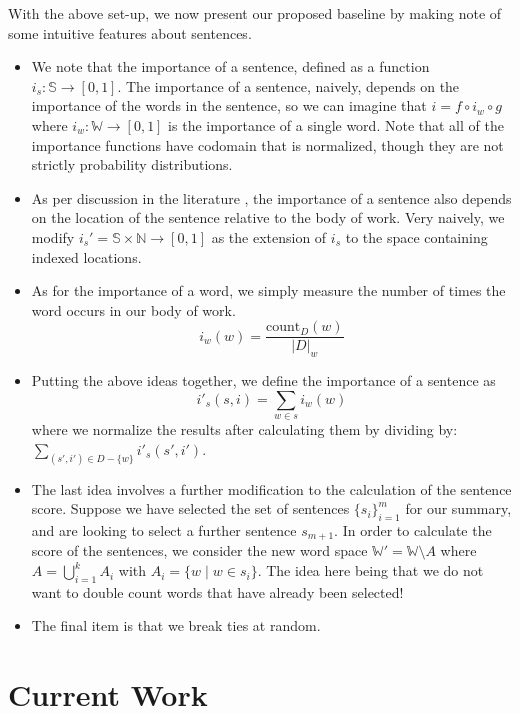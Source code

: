 \documentclass[10pt]{article}
\begin{document}
With the above set-up, we now present our proposed baseline by making note of some intuitive features about sentences.
\begin{itemize}
\item We note that the importance of a sentence, defined as a function $i_s: \mathbb{S} \to [0,1]$. The importance of a sentence, naively, depends on the importance of the words in the sentence, so we can imagine that $i = f \circ i_w \circ g$ where $i_w: \mathbb{W} \to [0,1]$ is the importance of a single word. Note that all of the importance functions have codomain that is normalized, though they are not strictly probability distributions.
\item As per discussion in the literature \cite{sentence_summary} \cite{hmm_summary} \cite{survey}, the importance of a sentence also depends on the location of the sentence relative to the body of work. Very naively, we modify $i_s' = \mathbb{S} \times \mathbb{N} \to [0,1]$ as the extension of $i_s$ to the space containing indexed locations.
\item As for the importance of a word, we simply measure the number of times the word occurs in our body of work.
$$
i_w(w) = \frac{\text{count}_D(w)}{|D|_w}
$$
\item Putting the above ideas together, we define the importance of a sentence as
$$
i'_s(s,i) = \sum_{w \in s} i_w(w)
$$
where we normalize the results after calculating them by dividing by: $\sum_{(s',i') \in D - \{w\}} i'_s(s',i')$.
\item The last idea involves a further modification to the calculation of the sentence score. Suppose we have selected the set of sentences $\{s_i\}_{i=1}^m$ for our summary, and are looking to select a further sentence $s_{m+1}$. In order to calculate the score of the sentences, we consider the new word space $\mathbb{W'} = \mathbb{W} \setminus A$ where $A = \bigcup_{i=1}^k A_i$ with $A_i = \{w \mid w \in s_i\}$. The idea here being that we do not want to double count words that have already been selected!
\item The final item is that we break ties at random.
\end{itemize}

\section{Current Work}
\end{document}
